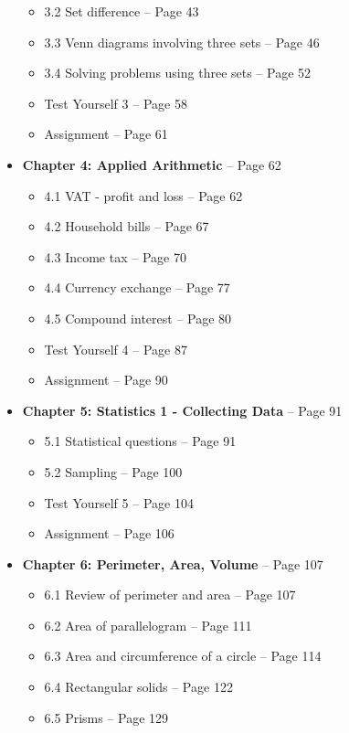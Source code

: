 \documentclass{article}
\begin{document}
\begin{itemize}
\begin{itemize}
            \item 3.2 Set difference -- Page 43
            \item 3.3 Venn diagrams involving three sets -- Page 46
            \item 3.4 Solving problems using three sets -- Page 52
            \item Test Yourself 3 -- Page 58
            \item Assignment -- Page 61
        \end{itemize}
    \item \textbf{Chapter 4: Applied Arithmetic} -- Page 62
        \begin{itemize}
            \item 4.1 VAT - profit and loss -- Page 62
            \item 4.2 Household bills -- Page 67
            \item 4.3 Income tax -- Page 70
            \item 4.4 Currency exchange -- Page 77
            \item 4.5 Compound interest -- Page 80
            \item Test Yourself 4 -- Page 87
            \item Assignment -- Page 90
        \end{itemize}
    \item \textbf{Chapter 5: Statistics 1 - Collecting Data} -- Page 91
        \begin{itemize}
            \item 5.1 Statistical questions -- Page 91
            \item 5.2 Sampling -- Page 100
            \item Test Yourself 5 -- Page 104
            \item Assignment -- Page 106
        \end{itemize}
        \newpage
    \item \textbf{Chapter 6: Perimeter, Area, Volume} -- Page 107
        \begin{itemize}
            \item 6.1 Review of perimeter and area -- Page 107
            \item 6.2 Area of parallelogram -- Page 111
            \item 6.3 Area and circumference of a circle -- Page 114
            \item 6.4 Rectangular solids -- Page 122
            \item 6.5 Prisms -- Page 129

\end{itemize}
\end{itemize}
\end{document}
